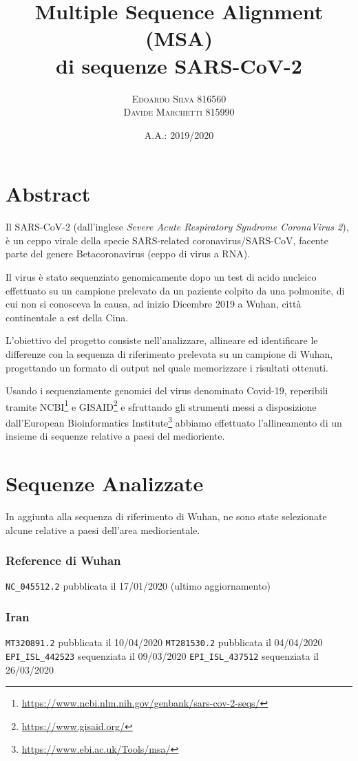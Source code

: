 \documentclass[11pt,italian]{article}
\title{Multiple Sequence Alignment (MSA) \\ di sequenze SARS-CoV-2}
\date{A.A.: 2019/2020}
\author{
    \textsc{Edoardo Silva} 816560 \\
    \textsc{Davide Marchetti} 815990
}
\makeatletter
\newcommand*{\lstitem}[1][]{%
  \setbox0\hbox\bgroup
    \patchcmd{\lst@InlineM}{\@empty}{\@empty\egroup\item[\usebox0]\leavevmode\ignorespaces}{}{}%
    \lstinline[#1]%
}
\makeatother
\begin{document}
\maketitle

\section*{Abstract}
Il SARS-CoV-2 (dall'inglese \textit{Severe Acute Respiratory Syndrome CoronaVirus 2}), è un ceppo virale della specie SARS-related coronavirus/SARS-CoV, facente parte del genere Betacoronavirus (ceppo di virus a RNA).

Il virus è stato sequenziato genomicamente dopo un test di acido nucleico effettuato su un campione prelevato da un paziente colpito da una polmonite, di cui non si conosceva la causa, ad inizio Dicembre 2019 a Wuhan, città continentale a est della Cina.

L'obiettivo del progetto consiste nell'analizzare, allineare ed identificare le differenze con la sequenza di riferimento prelevata su un campione di Wuhan, progettando un formato di output nel quale memorizzare i risultati ottenuti.

Usando i sequenziamente genomici del virus denominato Covid-19, reperibili tramite NCBI\footnote{\url{https://www.ncbi.nlm.nih.gov/genbank/sars-cov-2-seqs/}} e GISAID\footnote{\url{https://www.gisaid.org/}} e sfruttando gli strumenti messi a disposizione dall'European Bioinformatics Institute\footnote{\url{https://www.ebi.ac.uk/Tools/msa/}} abbiamo effettuato l'allineamento di un insieme di sequenze relative a paesi del medioriente.

\newpage
\section{Sequenze Analizzate}
In aggiunta alla sequenza di riferimento di Wuhan, ne sono state selezionate alcune relative a paesi dell'area mediorientale.

\subsubsection*{Reference di Wuhan}
\begin{description}
    \lstitem{NC_045512.2} pubblicata il 17/01/2020 (ultimo aggiornamento)
\end{description}

\subsubsection*{Iran}
\begin{description}
    \lstitem{MT320891.2} pubblicata il 10/04/2020
    \lstitem{MT281530.2} pubblicata il 04/04/2020
    \lstitem{EPI_ISL_442523} sequenziata il 09/03/2020
    \lstitem{EPI_ISL_437512} sequenziata il 26/03/2020
\end{description}
\end{document}
